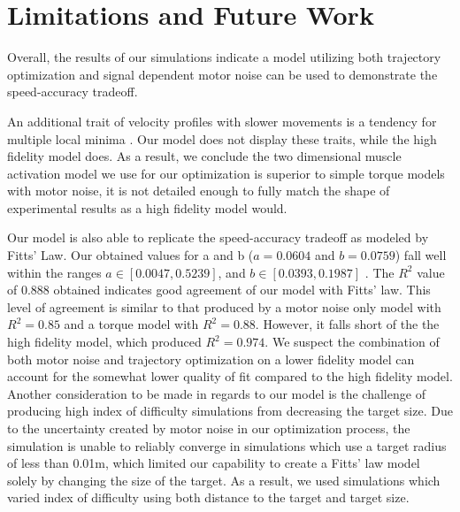 \documentclass[letterpaper, 10pt, conference]{ieeeconf}
\begin{document}
\section{Limitations and Future Work}
Overall, the results of our simulations indicate a model utilizing both trajectory optimization and signal dependent motor noise can be used to demonstrate the speed-accuracy tradeoff. 

An additional trait of velocity profiles with slower movements is a tendency for multiple local minima \cite{soechting_target_size}\cite{tanaka_min_variance}. Our model does not display these traits, while the high fidelity model does. As a result, we conclude the two dimensional muscle activation model we use for our optimization is superior to simple torque models with motor noise, it is not detailed enough to fully match the shape of experimental results as a high fidelity model would. 
\par Our model is also able to replicate the speed-accuracy tradeoff as modeled by Fitts' Law. Our obtained values for a and b (\(a = 0.0604\) and \(b = 0.0759\)) fall well within the ranges \(a \in [0.0047, 0.5239]\), and \(b \in [0.0393,0.1987]\) \cite{fitts_law_exp_data}. The \(R^2\) value of 0.888 obtained indicates good agreement of our model with Fitts' law. This level of agreement is similar to that produced by a motor noise only model with \(R^2 = 0.85\) \cite{c2} and a torque model with \(R^2 = 0.88\)\cite{original_paper_high_fidelity}. However, it falls short of the the high fidelity model, which produced \(R^2 = 0.974\)\cite{original_paper_high_fidelity}. We suspect the combination of both motor noise and trajectory optimization on a lower fidelity model can account for the somewhat lower quality of fit compared to the high fidelity model. Another consideration to be made in regards to our model is the challenge of producing high index of difficulty simulations from decreasing the target size. Due to the uncertainty created by motor noise in our optimization process, the simulation is unable to reliably converge in simulations which use a target radius of less than 0.01m, which limited our capability to create a Fitts' law model solely by changing the size of the target. As a result, we used simulations which varied index of difficulty using both distance to the target and target size. 
\end{document}
